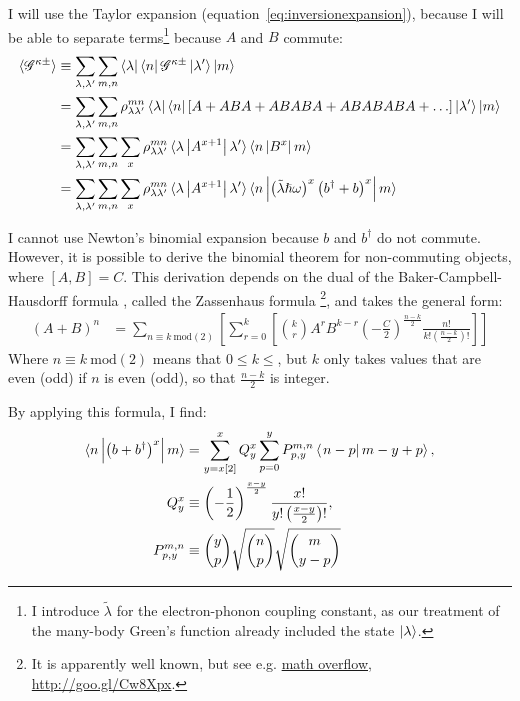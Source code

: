 I will use the Taylor expansion (equation~\ref{eq:inversionexpansion}), because I will be able to separate terms\footnote{I introduce $\tilde{\lambda}$ for the electron-phonon coupling constant, as our treatment of the many-body Green's function already included the state $\ket{\lambda}$.} because $A$ and $B$ commute:
\begin{align*}
\braket{\mathscr{G}^{\kappa\pm}} &\equiv \sum_{\lambda, \lambda^\prime} \sum_{m,n} \bra{\lambda}\bra{n} \mathscr{G}^{\kappa\pm} \ket{\lambda^\prime}\ket{m} \\
&= \sum_{\lambda, \lambda^\prime} \sum_{m,n}\rho_{\lambda\lambda^\prime}^{mn} \bra{\lambda}\bra{n}\left[A + ABA + ABABA + ABABABA + \ldots\right] \ket{\lambda^\prime}\ket{m} \\
&= \sum_{\lambda, \lambda^\prime} \sum_{m,n} \sum_x\rho_{\lambda\lambda^\prime}^{mn} \braket{\lambda \left| A^{x+1} \right| \lambda^\prime} \braket{n\left| B^x \right|m} \\
&= \sum_{\lambda, \lambda^\prime} \sum_{m,n} \sum_x\rho_{\lambda\lambda^\prime}^{mn} \braket{\lambda \left| A^{x+1} \right| \lambda^\prime} \braket{n\left| \left(\tilde{\lambda}\hslash\omega\right)^x\left(b^\dagger+b\right)^x \right|m} \\ 
\end{align*}

I cannot use Newton's binomial expansion because $b$ and $b^\dagger$ do not commute. However, it is possible to derive the binomial theorem for non-commuting objects, where $\left[A,B\right] = C$. This derivation depends on the dual of the Baker-Campbell-Hausdorff formula \cite{kaspermothpoulsen}, called the Zassenhaus formula \footnote{It is apparently well known, but see e.g. \href{http://goo.gl/Cw8Xpx}{math overflow, http://goo.gl/Cw8Xpx}.}, and takes the general form:
\begin{align*}
(A+B)^n &= \sum_{n\equiv k\:\text{mod}(2)}\left[ \sum^k_{r=0}\left[ \binom{k}{r}A^r B^{k-r} \left(-\frac{C}{2}\right)^\frac{n-k}{2} \frac{n!}{k! \left(\frac{n-k}{2}\right)!}\right]\right] 
\end{align*}
Where $n\equiv k\:\text{mod}(2)$ means that $0\leq k\leq$, but $k$ only takes values that are even (odd) if $n$ is even (odd), so that $\frac{n-k}{2}$ is integer.

By applying this formula, I find:
\begin{align*}
\braket{n \left| \left(b+b^\dagger\right)^x \right| m}&= \sum_{y=x[2]}^x Q^x_y \sum_{p=0}^{y} P^{m,n}_{p,y} \braket{\left. n-p \right| m-y+p}, \\
Q^x_y&\equiv \left(-\frac{1}{2}\right)^{\frac{x-y}{2}} \frac{ x! }{ y! \left(\frac{x-y}{2}\right)!},\\
P_{p,y}^{m,n} &\equiv \binom{y}{p} \sqrt{ \binom{n}{p}} \sqrt{\binom{m}{y-p}}
\end{align*}

